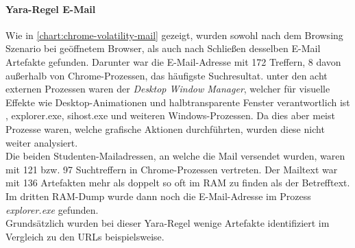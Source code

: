 \paragraph*{Yara-Regel \glqq{}E-Mail\grqq{}}\label{chap:ergebnisse-chrome-uncommon-volatility-email}
Wie in \autoref{chart:chrome-volatility-mail} gezeigt, wurden sowohl nach dem Browsing Szenario bei geöffnetem Browser, als auch nach Schließen desselben E-Mail Artefakte gefunden. Darunter war die E-Mail-Adresse mit 172 Treffern, 8 davon außerhalb von Chrome-Prozessen, das häufigste Suchresultat. unter den acht externen Prozessen waren der \textit{Desktop Window Manager}, welcher für visuelle Effekte wie Desktop-Animationen und halbtransparente Fenster verantwortlich ist \cite{dwmWebsite}, explorer.exe, sihost.exe und weiteren Windows-Prozessen. Da dies aber meist Prozesse waren, welche grafische Aktionen durchführten, wurden diese nicht weiter analysiert.\\
Die beiden Studenten-Mailadressen, an welche die Mail versendet wurden, waren mit 121 bzw. 97 Suchtreffern in Chrome-Prozessen vertreten. Der Mailtext war mit 136 Artefakten mehr als doppelt so oft im RAM zu finden als der Betrefftext. Im dritten RAM-Dump wurde dann noch die E-Mail-Adresse im Prozess \textit{explorer.exe} gefunden.\\
Grundsätzlich wurden bei dieser Yara-Regel wenige Artefakte identifiziert im Vergleich zu den URLs beispielsweise.


